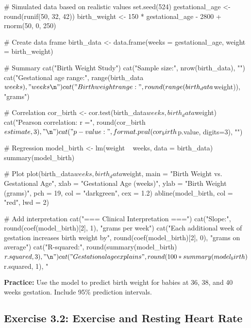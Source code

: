 \documentclass[11pt]{article}
\begin{document}
\begin{rcode}
# Simulated data based on realistic values
set.seed(524)
gestational_age <- round(runif(50, 32, 42))
birth_weight <- 150 * gestational_age - 2800 + rnorm(50, 0, 250)

# Create data frame
birth_data <- data.frame(weeks = gestational_age, weight = birth_weight)

# Summary
cat("Birth Weight Study\n")
cat("Sample size:", nrow(birth_data), "\n")
cat("Gestational age range:", range(birth_data$weeks), "weeks\n")
cat("Birth weight range:", round(range(birth_data$weight)), "grams\n\n")

# Correlation
cor_birth <- cor.test(birth_data$weeks, birth_data$weight)
cat("Pearson correlation: r =", round(cor_birth$estimate, 3), "\n")
cat("p-value:", format.pval(cor_birth$p.value, digits=3), "\n\n")

# Regression
model_birth <- lm(weight ~ weeks, data = birth_data)
summary(model_birth)

# Plot
plot(birth_data$weeks, birth_data$weight,
     main = "Birth Weight vs. Gestational Age",
     xlab = "Gestational Age (weeks)",
     ylab = "Birth Weight (grams)",
     pch = 19, col = "darkgreen", cex = 1.2)
abline(model_birth, col = "red", lwd = 2)

# Add interpretation
cat("\n=== Clinical Interpretation ===\n")
cat("Slope:", round(coef(model_birth)[2], 1), "grams per week\n")
cat("Each additional week of gestation increases birth weight by",
    round(coef(model_birth)[2], 0), "grams on average\n")
cat("R-squared:", round(summary(model_birth)$r.squared, 3), "\n")
cat("Gestational age explains",
    round(100 * summary(model_birth)$r.squared, 1),
    "%
\end{rcode}

\textbf{Practice:} Use the model to predict birth weight for babies at 36, 38, and 40 weeks gestation. Include 95\% prediction intervals.

\vspace{2cm}

\subsection{Exercise 3.2: Exercise and Resting Heart Rate}
\end{document}
